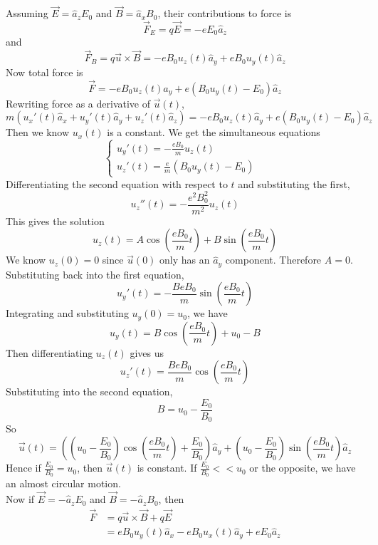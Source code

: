 \documentclass[answers]{exam}
\begin{document}
\begin{questions}

\begin{solution}
    Assuming $\vec E = \hat a_zE_0$ and $\vec B = \hat a_xB_0$, their contributions to force is
    $$\vec F_E = q\vec E = -eE_0\hat a_z$$
    and
    $$\vec F_B = q\vec u \times \vec B = -eB_0u_z(t) \hat a_y + eB_0u_y(t)\hat a_z$$
    Now total force is
    $$\vec F = -eB_0u_z(t) \hat a_y + e(B_0u_y(t) - E_0) \hat a_z$$
    Rewriting force as a derivative of $\vec u(t)$,
    $$m(u_x'(t)\hat a_x + u_y'(t)\hat a_y + u_z'(t)\hat a_z) = -eB_0u_z(t) \hat a_y + e(B_0u_y(t) - E_0) \hat a_z$$
    Then we know $u_x(t)$ is a constant. We get the simultaneous equations
    $$\begin{cases} u_y'(t) = -\frac{eB_0}{m} u_z(t) & \\ u_z'(t) = \frac{e}{m} (B_0u_y(t) - E_0) & \end{cases}$$
    Differentiating the second equation with respect to $t$ and substituting the first,
    $$u_z''(t) = -\frac{e^2B_0^2}{m^2} u_z(t)$$
    This gives the solution
    $$u_z(t) = A\cos\left(\frac{eB_0}{m}t\right) + B\sin\left(\frac{eB_0}{m}t\right)$$
    We know $u_z(0) = 0$ since $\vec u(0)$ only has an $\hat a_y$ component. Therefore $A = 0$. Substituting back into the first equation,
    $$u_y'(t) = -\frac{BeB_0}{m} \sin\left(\frac{eB_0}{m}t\right)$$
    Integrating and substituting $u_y(0) = u_0$, we have
    $$u_y(t) = B\cos\left(\frac{eB_0}{m}t\right) + u_0 - B$$
    Then differentiating $u_z(t)$ gives us
    $$u_z'(t) = \frac{BeB_0}{m} \cos\left(\frac{eB_0}{m}t\right)$$
    Substituting into the second equation,
    $$B = u_0 - \frac{E_0}{B_0}$$
    So
    $$\vec u(t) = \left(\left(u_0 - \frac{E_0}{B_0}\right)\cos\left(\frac{eB_0}{m}t\right) + \frac{E_0}{B_0}\right)\hat a_y + \left(u_0 - \frac{E_0}{B_0}\right)\sin\left(\frac{eB_0}{m}t\right)\hat a_z$$
    Hence if $\frac{E_0}{B_0} = u_0$, then $\vec u(t)$ is constant. If $\frac{E_0}{B_0} << u_0$ or the opposite, we have an almost circular motion. \\
    Now if $\vec E = -\hat a_zE_0$ and $\vec B = -\hat a_zB_0$, then
    \begin{align*}
        \vec F &= q\vec u \times \vec B + q\vec E \\
               &= eB_0u_y(t) \hat a_x - eB_0u_x(t) \hat a_y + eE_0\hat a_z \\

\end{align*}
\end{solution}
\end{questions}
\end{document}
